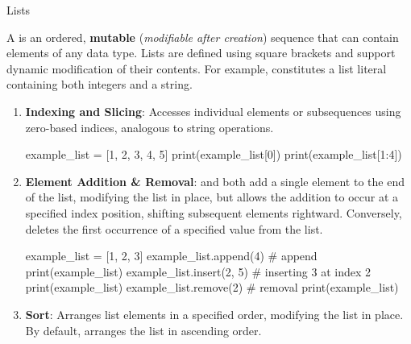 \documentclass[10pt]{article}
\begin{document}
    \begin{core}{Lists}

      A  is an ordered, \textbf{mutable} (\textit{modifiable after creation}) sequence that can contain elements of any data type. Lists are defined using square brackets and support dynamic modification of their contents. For example, \textcode{[1, 2, 3, "hello"]} constitutes a list literal containing both integers and a string.

      \begin{enumerate}

        \item \textbf{Indexing and Slicing}: Accesses individual elements or subsequences using zero-based indices, analogous to string operations.

        \begin{pyconsole}

          example_list = [1, 2, 3, 4, 5]
          print(example_list[0])
          print(example_list[1:4])

        \end{pyconsole}

        \item \textbf{Element Addition \& Removal}:  and  both add a single element to the end of the list, modifying the list in place, but  allows the addition to occur at a specified index position, shifting subsequent elements rightward. Conversely,  deletes the first occurrence of a specified value from the list.

        \begin{pyconsole}

          example_list = [1, 2, 3]
          example_list.append(4) # append
          print(example_list)
          example_list.insert(2, 5) # inserting 3 at index 2
          print(example_list)
          example_list.remove(2) # removal
          print(example_list)

        \end{pyconsole}

        \item \textbf{Sort}:  Arranges list elements in a specified order, modifying the list in place. By default,  arranges the list in ascending order.


\end{enumerate}
\end{core}
\end{document}
